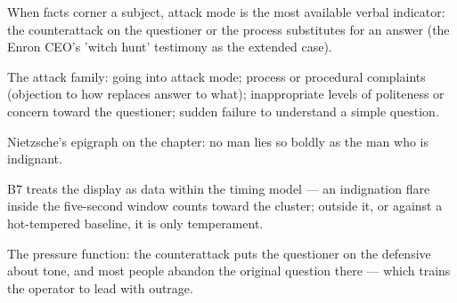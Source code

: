 

\begin{distilled}
  \item When facts corner a subject, attack mode is the most available verbal indicator: the counterattack on the questioner or the process substitutes for an answer (the Enron CEO's 'witch hunt' testimony as the extended case).
  \item The attack family: going into attack mode; process or procedural complaints (objection to how replaces answer to what); inappropriate levels of politeness or concern toward the questioner; sudden failure to understand a simple question.
  \item Nietzsche's epigraph on the chapter: no man lies so boldly as the man who is indignant.
  \item B7 treats the display as data within the timing model --- an indignation flare inside the five-second window counts toward the cluster; outside it, or against a hot-tempered baseline, it is only temperament.
  \item The pressure function: the counterattack puts the questioner on the defensive about tone, and most people abandon the original question there --- which trains the operator to lead with outrage.
\end{distilled}

